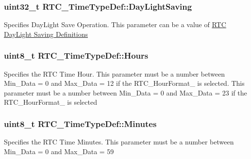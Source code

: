 \subsubsection[{\texorpdfstring{Day\+Light\+Saving}{DayLightSaving}}]{\setlength{\rightskip}{0pt plus 5cm}uint32\+\_\+t R\+T\+C\+\_\+\+Time\+Type\+Def\+::\+Day\+Light\+Saving}\hypertarget{struct_r_t_c___time_type_def_ac873d19a4d99d3f447f96ecae2bf3c5d}{}\label{struct_r_t_c___time_type_def_ac873d19a4d99d3f447f96ecae2bf3c5d}
Specifies Day\+Light Save Operation. This parameter can be a value of \hyperlink{group___r_t_c___day_light_saving___definitions}{R\+TC Day\+Light Saving Definitions} 
\subsubsection[{\texorpdfstring{Hours}{Hours}}]{\setlength{\rightskip}{0pt plus 5cm}uint8\+\_\+t R\+T\+C\+\_\+\+Time\+Type\+Def\+::\+Hours}\hypertarget{struct_r_t_c___time_type_def_afb56ed968b4967d127517ebb4ed40d8b}{}\label{struct_r_t_c___time_type_def_afb56ed968b4967d127517ebb4ed40d8b}
Specifies the R\+TC Time Hour. This parameter must be a number between Min\+\_\+\+Data = 0 and Max\+\_\+\+Data = 12 if the R\+T\+C\+\_\+\+Hour\+Format\+\_ is selected. This parameter must be a number between Min\+\_\+\+Data = 0 and Max\+\_\+\+Data = 23 if the R\+T\+C\+\_\+\+Hour\+Format\+\_ is selected 
\subsubsection[{\texorpdfstring{Minutes}{Minutes}}]{\setlength{\rightskip}{0pt plus 5cm}uint8\+\_\+t R\+T\+C\+\_\+\+Time\+Type\+Def\+::\+Minutes}\hypertarget{struct_r_t_c___time_type_def_a362931e6bba28836c36423197e429f29}{}\label{struct_r_t_c___time_type_def_a362931e6bba28836c36423197e429f29}
Specifies the R\+TC Time Minutes. This parameter must be a number between Min\+\_\+\+Data = 0 and Max\+\_\+\+Data = 59 
